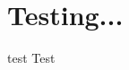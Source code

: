 \documentclass{article}
\begin{document}
\section{Testing...}
\begin{boxProb}[step=\tcbcounter1]{test}
  Test
\end{boxProb}
\end{document}

